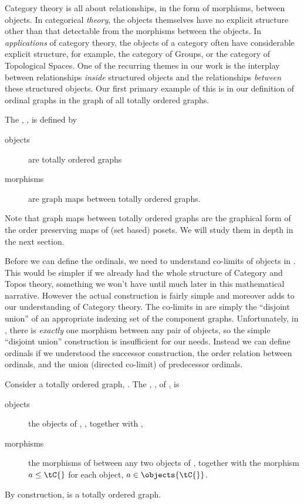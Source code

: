 Category theory is all about relationships, in the form of morphisms, between objects.  In
categorical \emph{theory}, the objects themselves have no explicit structure other than
that detectable from the morphisms between the objects.  In \emph{applications} of
category theory, the objects of a category often have considerable explicit structure, for
example, the category of Groups, or the category of Topological Spaces.  One of the
recurring themes in our work is the interplay between relationships \emph{inside}
structured objects and the relationships \emph{between} these structured objects.  Our
first primary example of this is in our definition of ordinal graphs in the graph of all
totally ordered graphs.
\begin{definition}
The , \totalOrderedC{}, is defined by
\begin{description}
\item[objects] are totally ordered graphs
\item[morphisms] are graph maps between totally ordered graphs.
\end{description}
\end{definition}
Note that graph maps between totally ordered graphs are the graphical form of the order
preserving maps of (set based) posets. We will study them in depth in the next section.

Before we can define the ordinals, we need to understand co-limits of objects in
\totalOrderedC{}.  This would be simpler if we already had the whole structure of Category
and Topos theory, something we won't have until much later in this mathematical narrative.
 However the actual construction is fairly simple and moreover adds to our understanding
of Category theory. The co-limits in \graphC{} are simply the ``disjoint union'' of an
appropriate indexing set of the component graphs.  Unfortunately, in \totalOrderedC{},
there is \emph{exactly} one morphism between any pair of objects, so the simple ``disjoint
union'' construction is insufficient for our needs.  Instead we can define ordinals if we
understood the successor construction, the order relation between ordinals, and the union
(directed co-limit) of predecessor ordinals.  

\begin{definition}
Consider a totally ordered graph, \tC{}. The , \successor{\tC{}},
of \tC{}, is
\begin{description}
\item[objects] the objects of \tC{}, \objects{\tC{}}, together with \tC{},
\item[morphisms] the morphisms of \tC{} between any two objects of \tC{} , together with
the morphism $a \leq \tC{}$  for each object, $a \in \objects{\tC{}}$.
\end{description}
\end{definition}
By construction, \successor{\tC{}} is a totally ordered graph.

